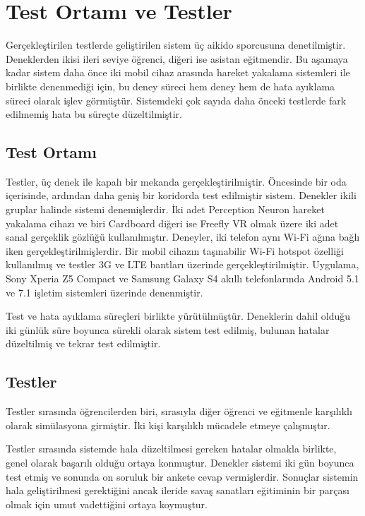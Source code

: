 \documentclass[a4paper, 12pt, titlepage]{article}
\begin{document}
\newpage
\section{Test Ortamı ve Testler}
Gerçekleştirilen testlerde geliştirilen sistem üç aikido sporcusuna denetilmiştir. Deneklerden
ikisi ileri seviye öğrenci, diğeri ise asistan eğitmendir. Bu aşamaya kadar sistem daha önce iki
mobil cihaz arasında hareket yakalama sistemleri ile birlikte denenmediği için, bu deney süreci hem
deney hem de hata ayıklama süreci olarak işlev görmüştür. Sistemdeki çok sayıda daha önceki
testlerde fark edilmemiş hata bu süreçte düzeltilmiştir.

\subsection{Test Ortamı}
Testler, üç denek ile kapalı bir mekanda gerçekleştirilmiştir. Öncesinde bir oda içerisinde, ardından
daha geniş bir koridorda test edilmiştir sistem. Denekler ikili gruplar halinde sistemi denemişlerdir.
İki adet Perception Neuron hareket yakalama cihazı ve biri Cardboard diğeri ise Freefly VR olmak üzere
iki adet sanal gerçeklik gözlüğü kullanılmıştır. Deneyler, iki telefon aynı Wi-Fi ağına bağlı iken
gerçekleştirilmişlerdir. Bir mobil cihazın taşınabilir Wi-Fi hotspot özelliği kullanılmış ve testler
3G ve LTE bantları üzerinde gerçekleştirilmiştir. Uygulama, Sony Xperia Z5 Compact ve Samsung Galaxy
S4 akıllı telefonlarında Android 5.1 ve 7.1 işletim sistemleri üzerinde denenmiştir.

Test ve hata ayıklama süreçleri birlikte yürütülmüştür. Deneklerin dahil olduğu iki günlük süre boyunca
sürekli olarak sistem test edilmiş, bulunan hatalar düzeltilmiş ve tekrar test edilmiştir.

\subsection{Testler}
Testler sırasında öğrencilerden biri, sırasıyla diğer öğrenci ve eğitmenle karşılıklı olarak simülasyona
girmiştir. İki kişi karşılıklı mücadele etmeye çalışmıştır.

Testler sırasında sistemde hala düzeltilmesi gereken hatalar olmakla birlikte, genel olarak başarılı
olduğu ortaya konmuştur. Denekler sistemi iki gün boyunca test etmiş ve sonunda on soruluk bir ankete
cevap vermişlerdir. Sonuçlar sistemin hala geliştirilmesi gerektiğini ancak ileride savaş sanatları
eğitiminin bir parçası olmak için umut vadettiğini ortaya koymuştur.
\end{document}
